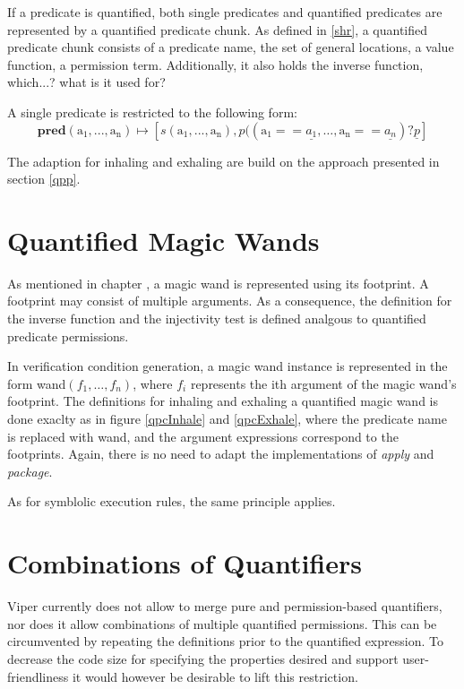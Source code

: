 \documentclass[12pt]{article}
\begin{document}
If a predicate is quantified, both single predicates and quantified predicates are represented by a quantified predicate chunk. As defined in \ref{shr}, a quantified predicate chunk consists of a predicate name, the set of general locations, a value function, a permission term. Additionally, it also holds the inverse function, which...? what is it used for?

A single predicate is restricted to the following form:\\

\begin{equation}
	\mathbf{pred}(\mathrm{a_1, ..., a_n})\mapsto [s(\mathrm{a_1, ..., a_n}), p((\mathrm{a_1} == \underline{a_1}, \dots, \mathrm{a_n} == \underline{a_n}) ? \underline{p}]
\end{equation}

The adaption for inhaling and exhaling are build on the approach presented in section \ref{qpp}.

\section{Quantified Magic Wands}
As mentioned in chapter , a magic wand is represented using its footprint. A footprint may consist of multiple arguments. As a consequence, the definition for the inverse function and the injectivity test is defined analgous to quantified predicate permissions.

In verification condition generation, a magic wand instance is represented in the form wand\( (f_1, \dots, f_n) \), where \(f_i\) represents the ith argument of the magic wand's footprint. The definitions for inhaling and exhaling a quantified magic wand is done exaclty as in figure \ref{qpcInhale} and \ref{qpcExhale}, where the predicate name is replaced with wand, and the argument expressions correspond to the footprints.
Again, there is no need to adapt the implementations of \textit{apply} and \textit{package}.

As for symblolic execution rules, the same principle applies.%

\section{Combinations of Quantifiers}
Viper currently does not allow to merge pure and permission-based quantifiers, nor does it allow combinations of multiple quantified permissions. This can be circumvented by repeating the definitions prior to the quantified expression.
To decrease the code size for specifying the properties desired and support user-friendliness it would however be desirable to lift this restriction.
\end{document}
